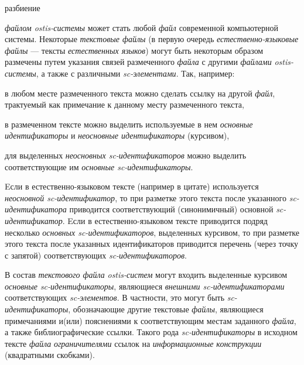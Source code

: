 \begin{SCn}

    \begin{scnrelfromset}{разбиение}
    \end{scnrelfromset}

\end{SCn}

\textit{файлом ostis-системы} может стать любой \textit{файл} современной компьютерной системы.
Некоторые \textit{текстовые файлы} (в первую очередь \textit{естественно-языковые файлы} --- тексты \textit{естественных языков}) могут быть некоторым образом размечены путем указания связей размеченного \textit{файла} с другими \textit{файлами} \textit{ostis-системы}, а также с различными \textit{sc-элементами}.
Так, например:
\begin{textitemize}
    \item в любом месте размеченного текста можно сделать ссылку на другой \textit{файл}, трактуемый как примечание к данному месту размеченного текста,
    \item в размеченном тексте можно выделить используемые в нем \textit{основные идентификаторы} и \textit{неосновные идентификаторы} (курсивом),
    \item для выделенных \textit{неосновных sc-идентификаторов} можно выделить соответствующие им \textit{основные sc-идентификаторы}.
\end{textitemize}

Eсли в естественно-языковом тексте (например в цитате) используется \textit{неосновной sc-идентификатор}, то при разметке этого текста после указанного \textit{sc-идентификатора} приводится соответствующий (синонимичный) основной \textit{sc-идентификатор}.
Eсли в естественно-языковом тексте приводится подряд несколько \textit{основных sc-идентификаторов}, выделенных курсивом, то при разметке этого текста после указанных идентификаторов приводится перечень (через точку с запятой) соответствующих \textit{sc-идентификаторов}.

В состав \textit{текстового файла} \textit{ostis-систем} могут входить выделенные курсивом \textit{основные sc-идентификаторы}, являющиеся \textit{внешними sc-идентификаторами} соответствующих \textit{sc-элементов}.
В частности, это могут быть \textit{sc-идентификаторы}, обозначающие другие текстовые \textit{файлы}, являющиеся примечаниями и(или) пояснениями к соответствующим местам заданного \textit{файла}, а также библиографические ссылки.
Такого рода \textit{sc-идентификаторы} в исходном тексте \textit{файла} \textit{ограничителями} ссылок на \textit{информационные конструкции} (квадратными скобками).


